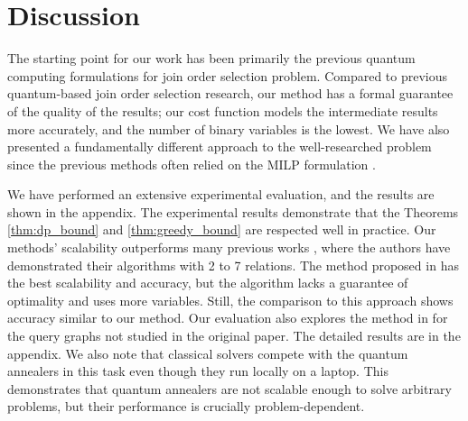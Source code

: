 \section{Discussion}

The starting point for our work has been primarily the previous quantum computing formulations \cite{Schonberger_Scherzinger_Mauerer, Winker_Calikyilmaz_Gruenwald_Groppe_2023, Schonberger_Trummer_Mauerer_2023, Nayak_Winker_Groppe_Groppe_2024, Franz_Winker_Groppe_Mauerer_2024,10.14778/3632093.3632112, DBLP:conf/q-data/SaxenaSS24} for join order selection problem. Compared to previous quantum-based join order selection research, our method has a formal guarantee of the quality of the results; our cost function models the intermediate results more accurately, and the number of binary variables is the lowest. We have also presented a fundamentally different approach to the well-researched problem since the previous methods often relied on the MILP formulation \cite{Trummer_Koch_2017}.

We have performed an extensive experimental evaluation, and the results are shown in the appendix. The experimental results demonstrate that the Theorems \ref{thm:dp_bound} and \ref{thm:greedy_bound} are respected well in practice. Our methods' scalability outperforms many previous works \cite{Schonberger_Scherzinger_Mauerer, Franz_Winker_Groppe_Mauerer_2024, Schonberger_Trummer_Mauerer_2023}, where the authors have demonstrated their algorithms with 2 to 7 relations. The method proposed in \cite{10.14778/3632093.3632112} has the best scalability and accuracy, but the algorithm lacks a guarantee of optimality and uses more variables. Still, the comparison to this approach shows accuracy similar to our method. Our evaluation also explores the method in \cite{10.14778/3632093.3632112} for the query graphs not studied in the original paper. The detailed results are in the appendix. We also note that classical solvers compete with the quantum annealers in this task even though they run locally on a laptop. This demonstrates that quantum annealers are not scalable enough to solve arbitrary problems, but their performance is crucially problem-dependent.


